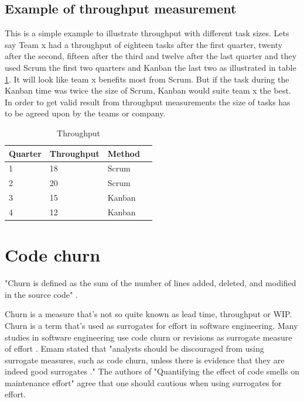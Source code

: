 \documentclass[UKenglish]{ifimaster}  %
\begin{document}
\subsection{Example of throughput measurement}
\label{sub:sub:throughput}
This is a simple example to illustrate throughput with different task sizes. Lets say Team x had a throughput of eighteen tasks after the first quarter, twenty after the second, fifteen after the third and twelve after the last quarter and they used Scrum the first two quarters and Kanban the last two as illustrated in table \ref{tt}. It will look like team x benefits most from Scrum. But if the task during the Kanban time was twice the size of Scrum, Kanban would suite team x the best. In order to get valid result from throughput measurements the size of tasks has to be agreed upon by the teams or company.
\begin{table}[ht]
\begin{center}
    \begin{tabular}{| l | l | l | l |}
    \hline
    Quarter & Throughput & Method\\ \hline
    1 & 18 & Scrum\\ \hline
    2 & 20 & Scrum \\ \hline
    3 & 15 & Kanban\\ \hline
    4 & 12 & Kanban\\ \hline
    \end{tabular}
\caption{Throughput}
\label{tt} %
\end{center}
\end{table}

\section{Code churn}
\label{sec:Churn}
"Churn is defined as the sum of the number of lines added, deleted, and modified in the source code" \parencite{Dag}.

Churn is a measure that's not so quite known as lead time, throughput or WIP. Churn is a term that's used as surrogates for effort in software engineering. Many studies in software engineering use code churn or revisions as surrogate measure of effort \parencite{yamashita2012quantifying}. Emam stated that "analysts should be discouraged from using surrogate measures, such as code churn, unless there is evidence that they are indeed good surrogates \parencite{el2000methodology}."  The authors of "Quantifying the effect of code smells on maintenance effort" agree that one should cautious when using surrogates for effort. 
\end{document}
